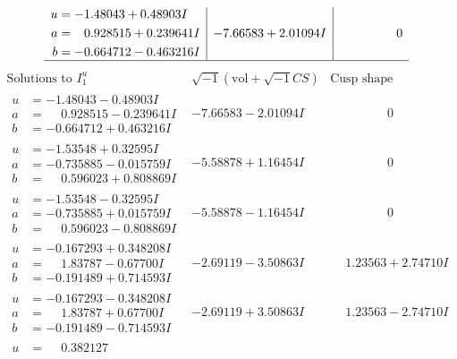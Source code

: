 \documentclass[1p]{elsarticle_modified}
\theoremstyle{definition}
\newcommand{\I}{\sqrt{-1}}
\begin{document}
$$\begin{array}{c|c|c}
\begin{aligned}
u &= -1.48043 + 0.48903 I \\
a &= \phantom{-}0.928515 + 0.239641 I \\
b &= -0.664712 - 0.463216 I\end{aligned}
 & -7.66583 + 2.01094 I & \phantom{-0.000000 } 0\\
 \hline 
 \end{array}$$\newpage$$\begin{array}{c|c|c}  
\text{Solutions to }I^u_{1}& \I (\text{vol} + \sqrt{-1}CS) & \text{Cusp shape}\\
 \hline 
\begin{aligned}
u &= -1.48043 - 0.48903 I \\
a &= \phantom{-}0.928515 - 0.239641 I \\
b &= -0.664712 + 0.463216 I\end{aligned}
 & -7.66583 - 2.01094 I & \phantom{-0.000000 } 0 \\ \hline\begin{aligned}
u &= -1.53548 + 0.32595 I \\
a &= -0.735885 - 0.015759 I \\
b &= \phantom{-}0.596023 + 0.808869 I\end{aligned}
 & -5.58878 + 1.16454 I & \phantom{-0.000000 } 0 \\ \hline\begin{aligned}
u &= -1.53548 - 0.32595 I \\
a &= -0.735885 + 0.015759 I \\
b &= \phantom{-}0.596023 - 0.808869 I\end{aligned}
 & -5.58878 - 1.16454 I & \phantom{-0.000000 } 0 \\ \hline\begin{aligned}
u &= -0.167293 + 0.348208 I \\
a &= \phantom{-}1.83787 - 0.67700 I \\
b &= -0.191489 + 0.714593 I\end{aligned}
 & -2.69119 - 3.50863 I & \phantom{-}1.23563 + 2.74710 I \\ \hline\begin{aligned}
u &= -0.167293 - 0.348208 I \\
a &= \phantom{-}1.83787 + 0.67700 I \\
b &= -0.191489 - 0.714593 I\end{aligned}
 & -2.69119 + 3.50863 I & \phantom{-}1.23563 - 2.74710 I \\ \hline\begin{aligned}
u &= \phantom{-}0.382127\phantom{ +0.000000I} \\

\end{aligned}
\end{array}$$
\end{document}
